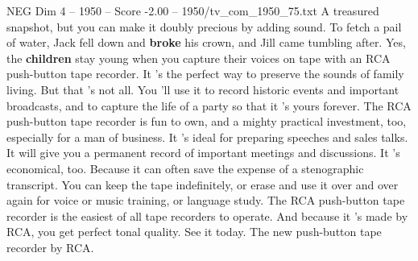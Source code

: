\begin{textsample}{NEG Dim 4 – 1950 – Score -2.00 – 1950/tv\_com\_1950\_75.txt}  \label{ex:f4_neg_015}
A treasured snapshot, but you can make it doubly precious by adding sound.
To fetch a pail of water, Jack fell down and \textbf{broke} his crown, and Jill came tumbling after.
Yes, the \textbf{children} stay young when you capture their voices on tape with an RCA push-button tape recorder.
It 's the perfect way to preserve the sounds of family living.
But that 's not all.
You 'll use it to record historic events and important broadcasts, and to capture the life of a party so that it 's yours forever.
The RCA push-button tape recorder is fun to own, and a mighty practical investment, too, especially for a man of business.
It 's ideal for preparing speeches and sales talks.
It will give you a permanent record of important meetings and discussions.
It 's economical, too.
Because it can often save the expense of a stenographic transcript.
You can keep the tape indefinitely, or erase and use it over and over again for voice or music training, or language study.
The RCA push-button tape recorder is the easiest of all tape recorders to operate.
And because it 's made by RCA, you get perfect tonal quality.
See it today.
The new push-button tape recorder by RCA.

\end{textsample}
